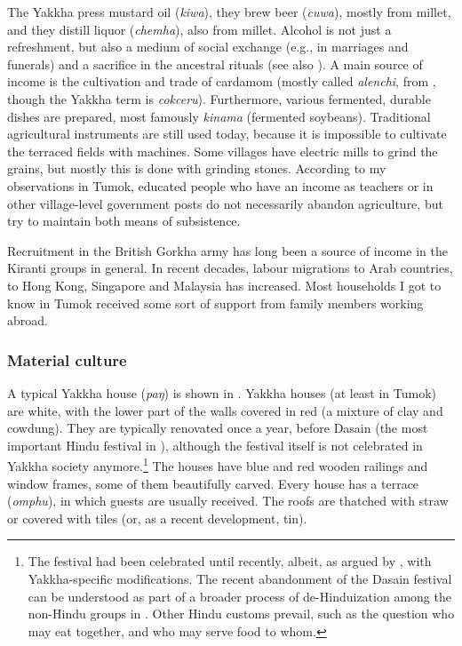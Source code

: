 The Yakkha press mustard oil (\emph{kiwa}), they brew beer (\emph{cuwa}), mostly from millet, and they distill liquor (\emph{chemha}), also from millet. Alcohol is not just a refreshment, but also a medium of social exchange (e.g., in marriages and fune\-rals) and a sacrifice in the ancestral rituals (see also \citet[124]{Russell1992_Yakha}).  A main source of income is the cultivation and trade of cardamom (mostly called \emph{alenchi}, from , though the Yakkha term is \emph{cokceru}). Furthermore, various fermented, durable dishes are prepared, most famously \emph{kinama} (fermented soybeans). Traditional agricultural instruments are still used today, because it is impossible to cultivate the terraced fields with machines. Some villages have electric mills to grind the grains, but mostly this is done with grinding stones. According to my observations in Tumok, educated people who have an income as teachers or in other village-level government posts do not necessarily abandon agriculture, but try to maintain both means of subsistence. 

Recruitment in the British Gorkha army has long been a source of income in the Kiranti groups in general. In recent decades, labour migrations to Arab countries, to Hong Kong, Singapore and Malaysia has increased. Most households I got to know in Tumok received some sort of support from family members working abroad. 


\subsubsection{Material culture}

A typical Yakkha house (\emph{paŋ}) is shown in . Yakkha houses (at least in Tumok) are white, with the lower part of the walls covered in red (a mixture of clay and cowdung). They are typically renovated once a year, before Dasain (the most important Hindu festival in ), although the festival itself is not celebrated in Yakkha society anymore.\footnote{The festival had been celebrated until recently, albeit, as argued by \citet{Russell2004Traditions}, with Yakkha-specific modifications. The recent abandonment of the Dasain festival can be understood as part of a broader process of de-Hinduization among the non-Hindu groups in . Other Hindu customs prevail, such as the question who may eat together, and who may serve food to whom.} The houses have blue and red wooden railings and window frames, some of them beautifully carved. Every house has a terrace (\emph{omphu}), in which guests are usually received. The roofs are thatched with straw or covered with tiles (or, as a recent development, tin).

